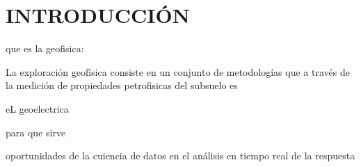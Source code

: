 \chapter{INTRODUCCIÓN}

que es la geofisica:

La exploración geofísica consiste en un conjunto de metodologías que a través de la medición de propiedades petrofisicas del subsuelo es 

eL geoelectrica

para que sirve


oportunidades de la cuiencia de datos en el análisis en tiempo real de la respuesta 



